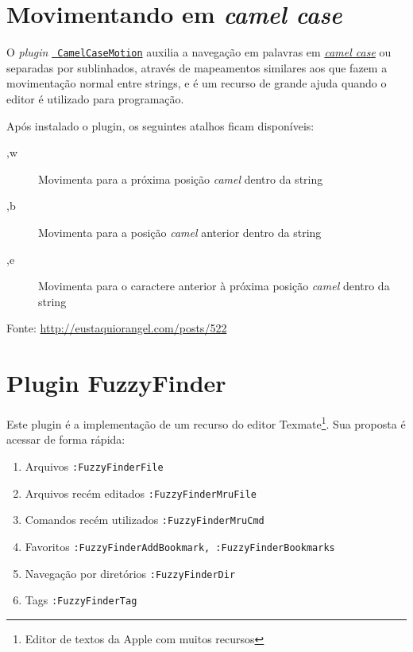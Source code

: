 \section{Movimentando em {\em camel case}}
\label{Movimentando em camel case}

O {\em plugin} \href{http://www.vim.org/scripts/script.php?script\_id=1905}{{\tt
CamelCaseMotion}} auxilia a navegação em palavras em
\href{http://en.wikipedia.org/wiki/Camel\_case}{{\em camel case}} ou separadas
por sublinhados, através de mapeamentos similares aos que fazem a movimentação
normal entre strings, e é um recurso de grande ajuda quando o editor é
utilizado para programação. 

Após instalado o plugin, os seguintes atalhos ficam disponíveis:
\begin{description}
 \item [,w] Movimenta para a próxima posição {\em camel} dentro da string
 \item [,b] Movimenta para a posição {\em camel} anterior dentro da string
 \item [,e] Movimenta para o caractere anterior à próxima posição {\em camel} dentro da string
\end{description}

Fonte: \url{http://eustaquiorangel.com/posts/522}

\section{Plugin FuzzyFinder}
\label{sec:Plugin FuzzyFinder}
                                                                       
Este plugin é a implementação de um recurso do editor 
Texmate\footnote{Editor de textos da Apple com muitos recursos}.
Sua proposta é acessar de forma rápida:


\begin{enumerate}
\item Arquivos \verb|:FuzzyFinderFile|
\item Arquivos recém editados \verb|:FuzzyFinderMruFile|
\item Comandos recém utilizados \verb|:FuzzyFinderMruCmd|
\item Favoritos \verb|:FuzzyFinderAddBookmark, :FuzzyFinderBookmarks|
\item Navegação por diretórios \verb|:FuzzyFinderDir|
\item Tags {\tt :FuzzyFinderTag}
\end{enumerate}

